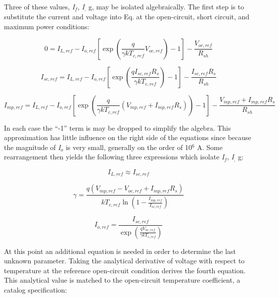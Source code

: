 Three of these values, \emph{I\(_{f}\)}, \emph{I\(_{,}\)} g, may be isolated algebraically. The first step is to substitute the current and voltage into Eq. at the open-circuit, short circuit, and maximum power conditions:

\begin{equation}
0 = {I_{L,ref}} - {I_{o,ref}}\left[ {\exp \left( {\frac{q}{{\gamma k{T_{c,ref}}}}{V_{oc,ref}}} \right) - 1} \right] - \frac{{{V_{oc,ref}}}}{{{R_{sh}}}}
\end{equation}

\begin{equation}
{I_{sc,ref}} = {I_{L,ref}} - {I_{o,ref}}\left[ {\exp \left( {\frac{{q{I_{sc,ref}}{R_s}}}{{\gamma k{T_{c,ref}}}}} \right) - 1} \right] - \frac{{{I_{sc,ref}}{R_s}}}{{{R_{sh}}}}
\end{equation}

\begin{equation}
{I_{mp,ref}} = {I_{L,ref}} - {I_{o,ref}}\left[ {\exp \left( {\frac{q}{{\gamma k{T_{c,ref}}}}\left( {{V_{mp,ref}} + {I_{mp,ref}}{R_s}} \right)} \right) - 1} \right] - \frac{{{V_{mp,ref}} + {I_{mp,ref}}{R_s}}}{{{R_{sh}}}}
\end{equation}

In each case the ``-1'' term is may be dropped to simplify the algebra. This approximation has little influence on the right side of the equations since because the magnitude of \emph{I\(_{o}\)} is very small, generally on the order of 10\(^{6}\) A. Some rearrangement then yields the following three expressions which isolate \emph{I\(_{f}\)}, \emph{I\(_{,}\)} g:

\begin{equation}
{I_{L,ref}} \approx {I_{sc,ref}}
\end{equation}

\begin{equation}
\gamma  = \frac{{q\left( {{V_{mp,ref}} - {V_{oc,ref}} + I_{mp,ref}^{}{R_s}} \right)}}{{k{T_{c,ref}}\ln \left( {1 - \frac{{{I_{mp,ref}}}}{{{I_{sc,ref}}}}} \right)}}
\end{equation}

\begin{equation}
{I_{o,ref}} = \frac{{{I_{sc,ref}}}}{{\exp \left( {\frac{{q{V_{oc,ref}}}}{{\gamma k{T_{c,ref}}}}} \right)}}
\end{equation}

At this point an additional equation is needed in order to determine the last unknown parameter. Taking the analytical derivative of voltage with respect to temperature at the reference open-circuit condition derives the fourth equation. This analytical value is matched to the open-circuit temperature coefficient, a catalog specification:


